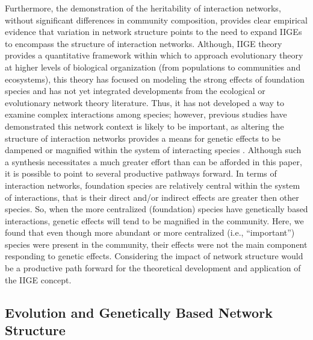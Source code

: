 \documentclass[fleqn,12pt]{olplainarticle}
\begin{document}
Furthermore, the demonstration of the heritability of interaction
networks, without significant differences in community composition,
provides clear empirical evidence that variation in network structure
points to the need to expand IIGEs to encompass the structure of
interaction networks. Although, IIGE theory provides a quantitative
framework within which to approach evolutionary theory at higher
levels of biological organization (from populations to communities and
ecosystems), this theory has focused on modeling the strong effects of
foundation species \citep{Shuster2006COMMUNITYSTRUCTURE, Whitham2012,
  Whitham2020IntraspecificEvolution} and has not yet integrated
developments from the ecological or evolutionary network theory
literature. Thus, it has not developed a way to examine complex
interactions among species; however, previous studies have
demonstrated this network context is likely to be important, as
altering the structure of interaction networks provides a means for
genetic effects to be dampened or magnified within the system of
interacting species \cite{Smith2011, Keith2017}. Although such a
synthesis necessitates a much greater effort than can be afforded in
this paper, it is possible to point to several productive pathways
forward. In terms of interaction networks, foundation species are
relatively central within the system of interactions, that is their
direct and/or indirect effects are greater then other species. So,
when the more centralized (foundation) species have genetically based
interactions, genetic effects will tend to be magnified in the
community. Here, we found that even though more abundant or more
centralized (i.e., ``important'') species were present in the
community, their effects were not the main component responding to
genetic effects. Considering the impact of network structure would be
a productive path forward for the theoretical development and
application of the IIGE concept.


\subsection*{Evolution and Genetically Based Network Structure}
\end{document}
